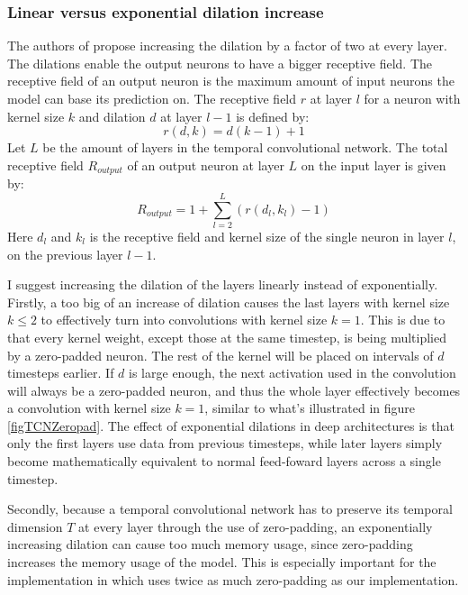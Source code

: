 \documentclass[a4paper, twoside]{article}
\begin{document}
\subsubsection{Linear versus exponential dilation increase}
The authors of \cite{tcn} propose increasing the dilation by a factor of two at every layer. The dilations enable the output neurons to have a bigger receptive field. The receptive field of an output neuron is the maximum amount of input neurons the model can base its prediction on. The receptive field $r$ at layer $l$ for a neuron with kernel size $k$ and dilation $d$ at layer $l-1$ is defined by: 
\begin{equation}
r(d, k) = d(k-1) +1
\end{equation}
Let $L$ be the amount of layers in the temporal convolutional network. The total receptive field $R_{output}$ of an output neuron at layer $L$ on the input layer is given by:
\begin{equation}
R_{output} = 1+\sum^L_{l=2} (r(d_l, k_l) -1)
\end{equation}
Here $d_l$ and $k_l$ is the receptive field and kernel size of the single neuron in layer $l$, on the previous layer $l-1$.

I suggest increasing the dilation of the layers linearly instead of exponentially. Firstly, a too big of an increase of dilation causes the last layers with kernel size $k \leq 2$ to effectively turn into convolutions with kernel size $k=1$. This is due to that every kernel weight, except those at the same timestep, is being multiplied by a zero-padded neuron. The rest of the kernel will be placed on intervals of $d$ timesteps earlier. If $d$ is large enough, the next activation used in the convolution will always be a zero-padded neuron, and thus the whole layer effectively becomes a convolution with kernel size $k=1$, similar to what's illustrated in figure \ref{figTCNZeropad}. The effect of exponential dilations in deep architectures is that only the first layers use data from previous timesteps, while later layers simply become mathematically equivalent to normal feed-foward layers across a single timestep.

Secondly, because a temporal convolutional network has to preserve its temporal dimension $T$ at every layer through the use of zero-padding, an exponentially increasing dilation can cause too much memory usage, since zero-padding increases the memory usage of the model. This is especially important for the implementation in \cite{tcn} which uses twice as much zero-padding as our implementation.
\end{document}
